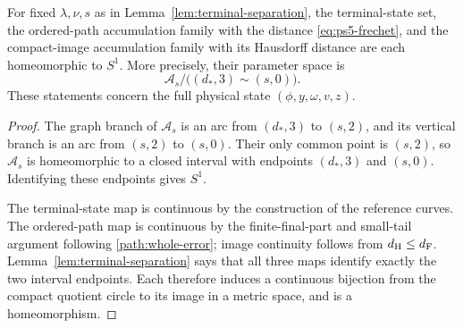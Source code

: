 \begin{corollary}
\label{cor:accumulation-circle}
For fixed $\lambda,\nu,s$ as in Lemma~\ref{lem:terminal-separation},
the terminal-state set, the ordered-path accumulation family with
the distance \eqref{eq:ps5-frechet}, and the compact-image accumulation
family with its Hausdorff distance are each homeomorphic to $S^1$.
More precisely, their parameter space is
\[
 \mathcal A_s/\bigl((d_*,3)\sim(s,0)\bigr).
\]
These statements concern the full physical state
$(\phi,y,\omega,v,z)$.
\end{corollary}

\begin{proof}
The graph branch of $\mathcal A_s$ is an arc from $(d_*,3)$ to
$(s,2)$, and its vertical branch is an arc from $(s,2)$ to $(s,0)$.
Their only common point is $(s,2)$, so $\mathcal A_s$ is homeomorphic to a closed
interval with endpoints $(d_*,3)$ and $(s,0)$. Identifying these
endpoints gives $S^1$.

The terminal-state map is continuous by the construction of the
reference curves. The ordered-path map is continuous by the finite-final-part and
small-tail argument following \eqref{path:whole-error}; image
continuity follows from $d_{\mathrm H}\le d_{\mathrm F}$. Lemma~\ref{lem:terminal-separation} says that all three
maps identify exactly the two interval endpoints. Each therefore
induces a continuous bijection from the compact quotient circle to
its image in a metric space, and is a homeomorphism.
\end{proof}
